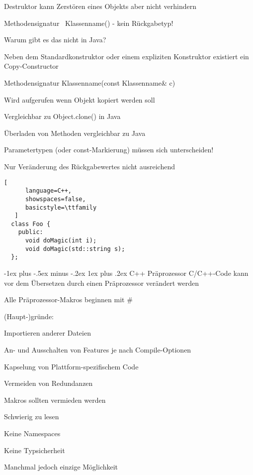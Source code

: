 \documentclass[10pt]{article}
\makeatletter
\renewcommand{\subsubsection}{\@startsection{subsubsection}{3}{0mm}%
                                {-1ex plus -.5ex minus -.2ex}%
                                {1ex plus .2ex}%
                                {\normalfont\small\bfseries}}
\makeatother
\begin{document}
\begin{itemize*}
\begin{itemize*}
\begin{itemize*}
      \item Destruktor kann Zerstören eines Objekts aber nicht verhindern
      \item Methodensignatur ~Klassenname() - kein Rückgabetyp!
      \item Warum gibt es das nicht in Java?
    \end{itemize*}
    \item Neben dem Standardkonstruktor oder einem expliziten Konstruktor existiert ein Copy-Constructor
    \begin{itemize*}
      \item Methodensignatur Klassenname(const Klassenname\& c)
      \item Wird aufgerufen wenn Objekt kopiert werden soll
      \item Vergleichbar zu Object.clone() in Java
    \end{itemize*}
  \end{itemize*}
  \item Überladen von Methoden vergleichbar zu Java
  \begin{itemize*}
    \item Parametertypen (oder const-Markierung) müssen sich unterscheiden!
    \item Nur Veränderung des Rückgabewertes nicht ausreichend
    \begin{lstlisting}[
      language=C++,
      showspaces=false,
      basicstyle=\ttfamily
   ]
  class Foo {
    public:
      void doMagic(int i);
      void doMagic(std::string s);
  };
  \end{lstlisting}
  \end{itemize*}
\end{itemize*}


\subsubsection{C++ Präprozessor}
C/C++-Code kann vor dem Übersetzen durch einen Präprozessor verändert werden
\begin{itemize*}
  \item Alle Präprozessor-Makros beginnen mit \#
  \item (Haupt-)gründe:
  \begin{itemize*}
    \item Importieren anderer Dateien
    \item An- und Ausschalten von Features je nach Compile-Optionen
    \item Kapselung von Plattform-spezifischem Code
    \item Vermeiden von Redundanzen
  \end{itemize*}
  \item Makros sollten vermieden werden
  \begin{itemize*}
    \item Schwierig zu lesen
    \item Keine Namespaces
    \item Keine Typsicherheit
  \end{itemize*}
  \item Manchmal jedoch einzige Möglichkeit
\end{itemize*}
\end{document}
